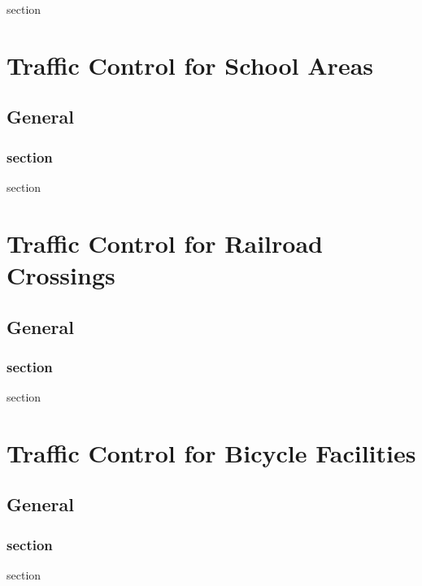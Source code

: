 \documentclass[9pt]{memoir}
\newif\ifshowstatus
\newcommand{\status}[1]{\ifshowstatus\section*{Status}\par#1\par\fi}
\begin{document}
section

\part{Traffic Control for School Areas}

\status{Blank.}

\chapter{General}

\section{section}

section

\part{Traffic Control for Railroad Crossings}

\status{Blank.}

\chapter{General}

\section{section}

section

\part{Traffic Control for Bicycle Facilities}

\status{Blank.}

\chapter{General}

\section{section}

section

\renewcommand{\thechapter}{\arabic{chapter}}

\status{Blank.}
\end{document}
